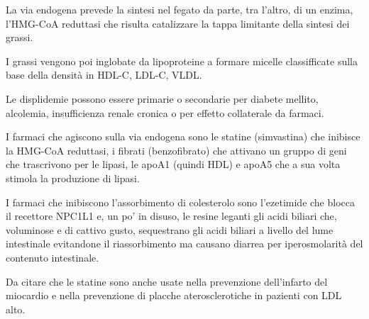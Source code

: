 La via endogena prevede la sintesi nel fegato da parte, tra l'altro, di un enzima, l'HMG-CoA reduttasi che risulta catalizzare la tappa limitante della sintesi dei grassi.

I grassi vengono poi inglobate da lipoproteine a formare micelle classifficate sulla base della densità in HDL-C, LDL-C, VLDL.

Le displidemie possono essere primarie o secondarie per diabete mellito, alcolemia, insufficienza renale cronica o per effetto collaterale da farmaci.

I farmaci che agiscono sulla via endogena sono le statine (simvastina) che inibisce la HMG-CoA reduttasi, i fibrati (benzofibrato) che attivano un gruppo di geni che trascrivono per le lipasi, le apoA1 (quindi HDL) e apoA5 che a sua volta stimola la produzione di lipasi.

I farmaci che inibiscono l'assorbimento di colesterolo sono l'ezetimide che blocca il recettore NPC1L1 e, un po' in disuso, le resine leganti gli acidi biliari che, voluminose e di cattivo gusto, sequestrano gli acidi biliari a livello del lume intestinale evitandone il riassorbimento ma causano diarrea per iperosmolarità del contenuto intestinale.

Da citare che le statine sono anche usate nella prevenzione dell'infarto del miocardio e nella prevenzione di placche aterosclerotiche in pazienti con LDL alto.

\newpage